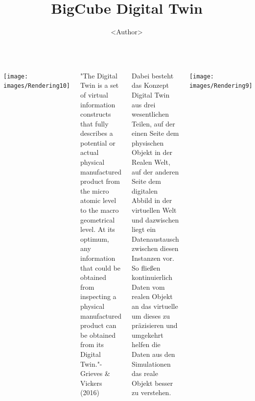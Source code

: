 \documentclass[25pt,a0paper, portrait]{tikzposter}
\title{BigCube Digital Twin}
\author{<Author>}
\begin{document}
 
\maketitle

\begin{columns} 
	
	{
		{
			\begin{tikzfigure}
				\texttt{[image: images/Rendering10]}
			\end{tikzfigure}	
		}
		{
			"The Digital Twin is a set of virtual information constructs that fully describes a potential or actual physical manufactured product from the micro atomic level to the macro geometrical level. At its optimum, any information that could be obtained from inspecting a physical manufactured product can be obtained from its Digital Twin."- Grieves \& Vickers (2016)
			
			Dabei besteht das Konzept Digital Twin aus drei wesentlichen Teilen, auf der einen Seite dem physischen Objekt in der Realen Welt, auf der anderen Seite dem digitalen Abbild in der virtuellen Welt und dazwischen liegt ein Datenaustausch zwischen diesen Instanzen vor. So fließen kontinuierlich Daten vom realen Objekt an das virtuelle um dieses zu präzisieren und umgekehrt helfen die Daten aus den Simulationen das reale Objekt besser zu verstehen.
		}
	}


	{
		{
			\begin{tikzfigure}
				\texttt{[image: images/Rendering9]}
			\end{tikzfigure}
		}
	}
\end{columns}
\end{document}

